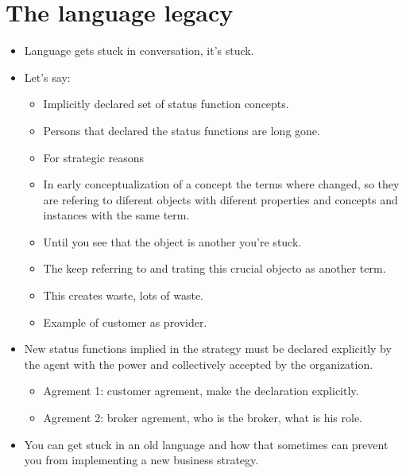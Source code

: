 \section{The language legacy}
\begin{itemize}
    \item Language gets stuck in conversation, it's stuck.
    \item Let's say:
        \begin{itemize}
            \item Implicitly declared set of status function concepts.
            \item Persons that declared the status functions are long gone.
            \item For strategic reasons  
            \item In early conceptualization of a concept the terms where changed, so they are refering to diferent objects with diferent properties and concepts and instances with the same term.
            \item Until you see that the object is another you're stuck.
            \item The keep referring to and trating this crucial objecto as another term.
            \item This creates waste, lots of waste.
            \item Example of customer as provider.
        \end{itemize}
    
    \item New status functions implied in the strategy must be declared explicitly by the agent with the power and collectively accepted by the organization.
        \begin{itemize}
            \item Agrement 1: customer agrement, make the declaration explicitly.
            \item Agrement 2: broker agrement, who is the broker, what is his role.
        \end{itemize}
    
    \item You can get stuck in an old language and how that sometimes can prevent you from implementing a new business strategy.
\end{itemize}


